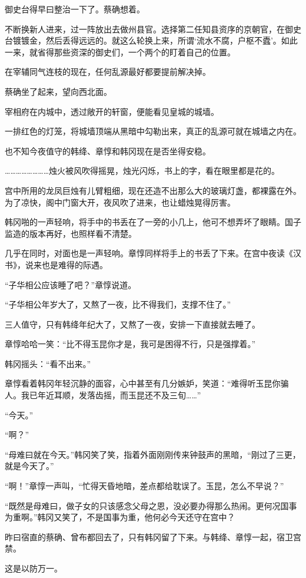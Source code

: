御史台得早曰整治一下了。蔡确想着。

不断换新人进来，过一阵放出去做州县官。选择第二任知县资序的京朝官，在御史台镀镀金，然后丢得远远的。就这么轮换上来，所谓‘流水不腐，户枢不蠹’。如此一来，就省得那些资深的御史们，一个两个的盯着自己的位置。

在宰辅同气连枝的现在，任何乱源最好都要提前解决掉。

蔡确坐了起来，望向西北面。

宰相府在内城中，透过敞开的轩窗，便能看见皇城的城墙。

一排红色的灯笼，将城墙顶端从黑暗中勾勒出来，真正的乱源可就在城墙之内在。

也不知今夜值守的韩绛、章惇和韩冈现在是否坐得安稳。

……………………烛火被风吹得摇晃，烛光闪烁，书上的字，看在眼里都是花的。

宫中所用的龙凤巨烛有儿臂粗细，现在还造不出那么大的玻璃灯盏，都裸露在外。为了凉快，阁中门窗大开，夜风吹了进来，也让蜡烛晃得厉害。

韩冈啪的一声轻响，将手中的书丢在了一旁的小几上，他可不想弄坏了眼睛。国子监造的版本再好，也照样看不清楚。

几乎在同时，对面也是一声轻响。章惇同样将手上的书丢了下来。在宫中夜读《汉书》，说来也是难得的际遇。

“子华相公应该睡了吧？”章惇说道。

“子华相公年岁大了，又熬了一夜，比不得我们，支撑不住了。”

三人值守，只有韩绛年纪大了，又熬了一夜，安排一下直接就去睡了。

章惇哈哈一笑：“比不得玉昆你才是，我可是困得不行，只是强撑着。”

韩冈摇头：“看不出来。”

章惇看着韩冈年轻沉静的面容，心中甚至有几分嫉妒，笑道：“难得听玉昆你骗人。我已年近耳顺，发落齿摇，而玉昆还不及三旬……”

“今天。”

“啊？”

“母难曰就在今天。”韩冈笑了笑，指着外面刚刚传来钟鼓声的黑暗，“刚过了三更，就是今天了。”

“啊！”章惇一声叫，“忙得天昏地暗，差点都给耽误了。玉昆，怎么不早说？”

“既然是母难曰，做子女的只该感念父母之恩，没必要办得那么热闹。更何况国事为重啊。”韩冈又笑了，不是国事为重，他何必今天还守在宫中？

昨曰宿直的蔡确、曾布都回去了，只有韩冈留了下来。与韩绛、章惇一起，宿卫宫禁。

这是以防万一。

